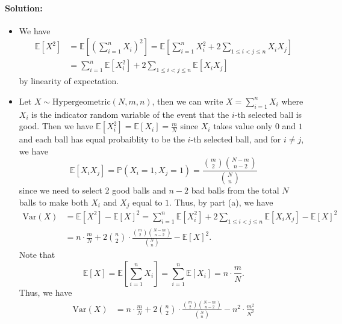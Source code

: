 \documentclass[a4paper,12pt]{article}
\begin{document}
\paragraph{Solution:}
\begin{itemize}
	\item [(a)] We have 
	\begin{align*}
		\mathbb{E} [X^2] &= \mathbb{E} \left[ \left( \sum_{i=1}^n X_i \right)^2 \right] = \mathbb{E} \left[ \sum_{i=1}^n X_i^2 + 2\sum_{1 \le i < j \le n} X_i X_j \right] \\
		&= \sum_{i=1}^n \mathbb{E} [X_i^2] + 2\sum_{1 \le i < j \le n} \mathbb{E} [X_i X_j]
	\end{align*}
	by linearity of expectation.
	\item [(b)] Let \(X \sim \mathrm{Hypergeometric}(N, m, n) \), then we can write \(X = \sum_{i=1}^n X_i\) where \(X_i\) is the indicator random variable of the event that the \(i\)-th selected ball is good. Then we have \(\mathbb{E} [X_i^2] = \mathbb{E} [X_i] = \frac{m}{N}\) since \(X_i\) takes value only \(0\) and \(1\) and each ball has equal probaiblity to be the \(i\)-th selected ball, and for \(i \neq j\), we have
	\[
		\mathbb{E} [X_i X_j] = \mathbb{P} (X_i = 1, X_j = 1) = \frac{\binom{m}{2} \binom{N - m}{n - 2}}{\binom{N}{n}}
	\]
	since we need to select 2 good balls and \(n - 2\) bad balls from the total \(N\) balls to make both \(X_i\) and \(X_j\) equal to \(1\).
	Thus, by part (a), we have
	\begin{align*}
		\mathrm{Var} (X) &= \mathbb{E} [X^2] - \mathbb{E} [X]^2 = \sum_{i=1}^n \mathbb{E} [X_i^2] + 2\sum_{1 \le i < j \le	 n} \mathbb{E} [X_i X_j] - \mathbb{E} [X]^2 \\
		&= n \cdot \frac{m}{N} + 2\binom{n}{2} \cdot \frac{\binom{m}{2} \binom{N - m}{n - 2}}{\binom{N}{n}} - \mathbb{E} [X]^2.
	\end{align*} 
	Note that 
	\[
		\mathbb{E} [X] = \mathbb{E} \left[ \sum_{i=1}^n X_i \right] = \sum_{i=1}^n \mathbb{E} [X_i] = n \cdot \frac{m}{N}.
	\]
	Thus, we have
	\begin{align*}
		\mathrm{Var} (X) &= n \cdot \frac{m	}{N} + 2\binom{n}{2} \cdot \frac{\binom{m}{2} \binom{N - m}{n - 2}}{\binom{N}{n}} - n^2 \cdot \frac{m^2}{N^2}
	\end{align*}	
\end{itemize}
\end{document}
